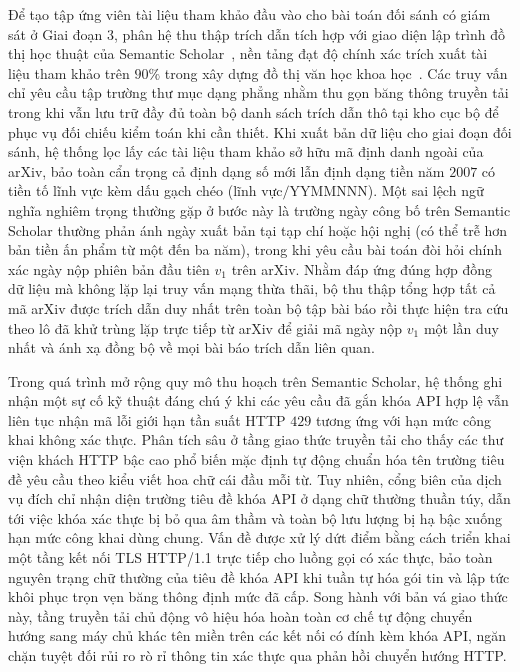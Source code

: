 Để tạo tập ứng viên tài liệu tham khảo đầu vào cho bài toán đối sánh có giám sát ở Giai đoạn 3, phân hệ thu thập trích dẫn tích hợp với giao diện lập trình đồ thị học thuật của Semantic Scholar~\cite{kinney2023}, nền tảng đạt độ chính xác trích xuất tài liệu tham khảo trên $90\%$ trong xây dựng đồ thị văn học khoa học~\cite{ammar2018}. Các truy vấn chỉ yêu cầu tập trường thư mục dạng phẳng nhằm thu gọn băng thông truyền tải trong khi vẫn lưu trữ đầy đủ toàn bộ danh sách trích dẫn thô tại kho cục bộ để phục vụ đối chiếu kiểm toán khi cần thiết. Khi xuất bản dữ liệu cho giai đoạn đối sánh, hệ thống lọc lấy các tài liệu tham khảo sở hữu mã định danh ngoài của arXiv, bảo toàn cẩn trọng cả định dạng số mới lẫn định dạng tiền năm $2007$ có tiền tố lĩnh vực kèm dấu gạch chéo ($\text{lĩnh vực}/\text{YYMMNNN}$). Một sai lệch ngữ nghĩa nghiêm trọng thường gặp ở bước này là trường ngày công bố trên Semantic Scholar thường phản ánh ngày xuất bản tại tạp chí hoặc hội nghị (có thể trễ hơn bản tiền ấn phẩm từ một đến ba năm), trong khi yêu cầu bài toán đòi hỏi chính xác ngày nộp phiên bản đầu tiên $v_1$ trên arXiv. Nhằm đáp ứng đúng hợp đồng dữ liệu mà không lặp lại truy vấn mạng thừa thãi, bộ thu thập tổng hợp tất cả mã arXiv được trích dẫn duy nhất trên toàn bộ tập bài báo rồi thực hiện tra cứu theo lô đã khử trùng lặp trực tiếp từ arXiv để giải mã ngày nộp $v_1$ một lần duy nhất và ánh xạ đồng bộ về mọi bài báo trích dẫn liên quan.

Trong quá trình mở rộng quy mô thu hoạch trên Semantic Scholar, hệ thống ghi nhận một sự cố kỹ thuật đáng chú ý khi các yêu cầu đã gắn khóa API hợp lệ vẫn liên tục nhận mã lỗi giới hạn tần suất HTTP $429$ tương ứng với hạn mức công khai không xác thực. Phân tích sâu ở tầng giao thức truyền tải cho thấy các thư viện khách HTTP bậc cao phổ biến mặc định tự động chuẩn hóa tên trường tiêu đề yêu cầu theo kiểu viết hoa chữ cái đầu mỗi từ. Tuy nhiên, cổng biên của dịch vụ đích chỉ nhận diện trường tiêu đề khóa API ở dạng chữ thường thuần túy, dẫn tới việc khóa xác thực bị bỏ qua âm thầm và toàn bộ lưu lượng bị hạ bậc xuống hạn mức công khai dùng chung. Vấn đề được xử lý dứt điểm bằng cách triển khai một tầng kết nối TLS HTTP/1.1 trực tiếp cho luồng gọi có xác thực, bảo toàn nguyên trạng chữ thường của tiêu đề khóa API khi tuần tự hóa gói tin và lập tức khôi phục trọn vẹn băng thông định mức đã cấp. Song hành với bản vá giao thức này, tầng truyền tải chủ động vô hiệu hóa hoàn toàn cơ chế tự động chuyển hướng sang máy chủ khác tên miền trên các kết nối có đính kèm khóa API, ngăn chặn tuyệt đối rủi ro rò rỉ thông tin xác thực qua phản hồi chuyển hướng HTTP.

